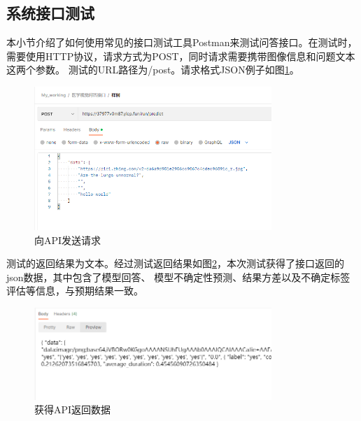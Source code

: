 \subsection{系统接口测试}
本小节介绍了如何使用常见的接口测试工具Postman来测试问答接口。在测试时，需要使用HTTP协议，请求方式为POST，同时请求需要携带图像信息和问题文本这两个参数。
测试的URL路径为/post。请求格式JSON例子如图\ref{post}。
\begin{figure}[htbp]
	\centering	
	\includegraphics[width=0.8\textwidth]{Fig/myfig/chapter5/post.png}  %
	\caption{\label{post}向API发送请求} 
\end{figure}

测试的返回结果为文本。经过测试返回结果如图\ref{get}，本次测试获得了接口返回的json数据，其中包含了模型回答、
模型不确定性预测、结果方差以及不确定标签评估等信息，与预期结果一致。
\begin{figure}[htbp]
	\centering	
	\includegraphics[width=0.8\textwidth]{Fig/myfig/chapter5/post_get.png}  %
	\caption{\label{get}获得API返回数据} 
\end{figure}

